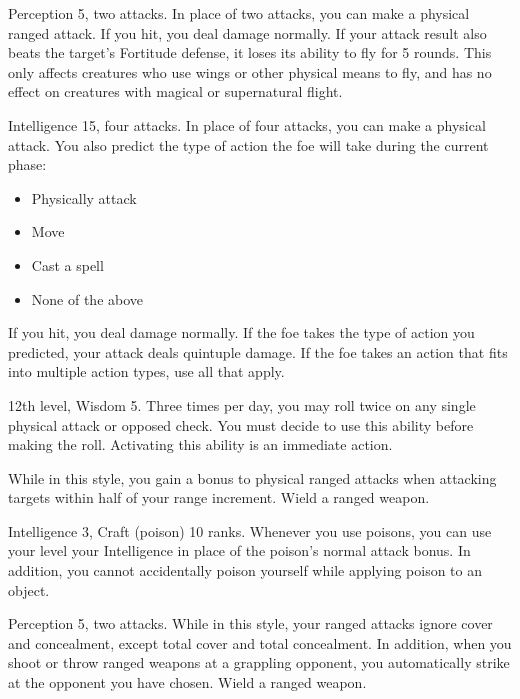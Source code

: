 \featpre Perception 5, two attacks.
\featben In place of two attacks, you can make a physical ranged attack.
If you hit, you deal damage normally.
If your attack result also beats the target's Fortitude defense, it loses its ability to fly for 5 rounds.
This only affects creatures who use wings or other physical means to fly, and has no effect on creatures with magical or supernatural flight.

\featpre Intelligence 15, four attacks.
\featben In place of four attacks, you can make a physical attack.
You also predict the type of action the foe will take during the current phase:
\begin{itemize}
    \item Physically attack
    \item Move
    \item Cast a spell
    \item None of the above
\end{itemize}
If you hit, you deal damage normally.
If the foe takes the type of action you predicted, your attack deals quintuple damage.
If the foe takes an action that fits into multiple action types, use all that apply.

\featpres 12th level, Wisdom 5.
\featben Three times per day, you may roll twice on any single physical attack or opposed check.
You must decide to use this ability before making the roll.
Activating this ability is an immediate action.

\featben While in this style, you gain a  bonus to physical ranged attacks when attacking targets within half of your range increment.
\stylereq Wield a ranged weapon.

\featpres Intelligence 3, Craft (poison) 10 ranks.
\featben Whenever you use poisons, you can use your level \add your Intelligence in place of the poison's normal attack bonus.
In addition, you cannot accidentally poison yourself while applying poison to an object.

\featpres Perception 5, two attacks.
\featben While in this style, your ranged attacks ignore cover and concealment, except total cover and total concealment.
In addition, when you shoot or throw ranged weapons at a grappling opponent, you automatically strike at the opponent you have chosen.
\stylereq Wield a ranged weapon.

